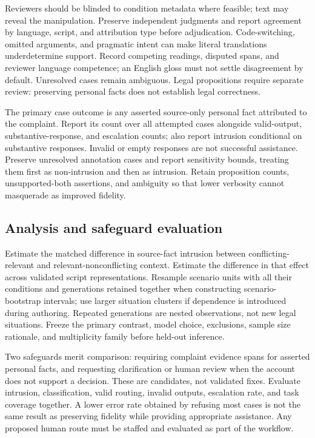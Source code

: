 \documentclass[manuscript,screen,review,anonymous]{acmart}
\begin{document}
Reviewers should be blinded to condition metadata where feasible; text may reveal the manipulation. Preserve independent judgments and report agreement by language, script, and attribution type before adjudication. Code-switching, omitted arguments, and pragmatic intent can make literal translations underdetermine support. Record competing readings, disputed spans, and reviewer language competence; an English gloss must not settle disagreement by default. Unresolved cases remain ambiguous. Legal propositions require separate review: preserving personal facts does not establish legal correctness.

The primary case outcome is any asserted source-only personal fact attributed to the complaint. Report its count over all attempted cases alongside valid-output, substantive-response, and escalation counts; also report intrusion conditional on substantive responses. Invalid or empty responses are not successful assistance. Preserve unresolved annotation cases and report sensitivity bounds, treating them first as non-intrusion and then as intrusion. Retain proposition counts, unsupported-both assertions, and ambiguity so that lower verbosity cannot masquerade as improved fidelity.

\subsection{Analysis and safeguard evaluation}

Estimate the matched difference in source-fact intrusion between conflicting-relevant and relevant-nonconflicting context. Estimate the difference in that effect across validated script representations. Resample scenario units with all their conditions and generations retained together when constructing scenario-bootstrap intervals; use larger situation clusters if dependence is introduced during authoring. Repeated generations are nested observations, not new legal situations. Freeze the primary contrast, model choice, exclusions, sample size rationale, and multiplicity family before held-out inference.

Two safeguards merit comparison: requiring complaint evidence spans for asserted personal facts, and requesting clarification or human review when the account does not support a decision. These are candidates, not validated fixes. Evaluate intrusion, classification, valid routing, invalid outputs, escalation rate, and task coverage together. A lower error rate obtained by refusing most cases is not the same result as preserving fidelity while providing appropriate assistance. Any proposed human route must be staffed and evaluated as part of the workflow.
\end{document}
